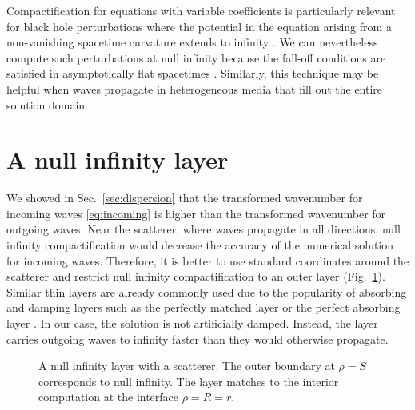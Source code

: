 \documentclass[final,onefignum,onetabnum]{siamart190516}
\begin{document}
Compactification for equations with variable coefficients is particularly relevant for black hole perturbations where the potential in the equation arising from a non-vanishing spacetime curvature extends to infinity \cite{regge1957stability}. We can nevertheless compute such perturbations at null infinity because the fall-off conditions are satisfied in asymptotically flat spacetimes \cite{ZengFramework, jaramillo2021pseudospectrum}. Similarly, this technique may be helpful when waves propagate in heterogeneous media that fill out the entire solution domain.

\section{A null infinity layer}\label{sec:nil}
We showed in Sec.~\ref{sec:dispersion} that the transformed wavenumber for incoming waves \eqref{eq:incoming} is higher than the transformed wavenumber for outgoing waves. Near the scatterer, where waves propagate in all directions, null infinity compactification would decrease the accuracy of the numerical solution for incoming waves. Therefore, it is better to use standard coordinates around the scatterer and restrict null infinity compactification to an outer layer (Fig.~\ref{fig:annulus}). Similar thin layers are already commonly used due to the popularity of absorbing and damping layers such as the perfectly matched layer \cite{BERENGER1994185} or the perfect absorbing layer \cite{wang2017perfect, yang2021truly}. In our case, the solution is not artificially damped. Instead, the layer carries outgoing waves to infinity faster than they would otherwise propagate. 

\begin{figure}[tbhp]
\centering
{}
\caption{A null infinity layer with a scatterer. The outer boundary at $\rho=S$ corresponds to null infinity. The layer matches to the interior computation at the interface $\rho=R=r$.}
\label{fig:annulus}
\end{figure}
\end{document}
